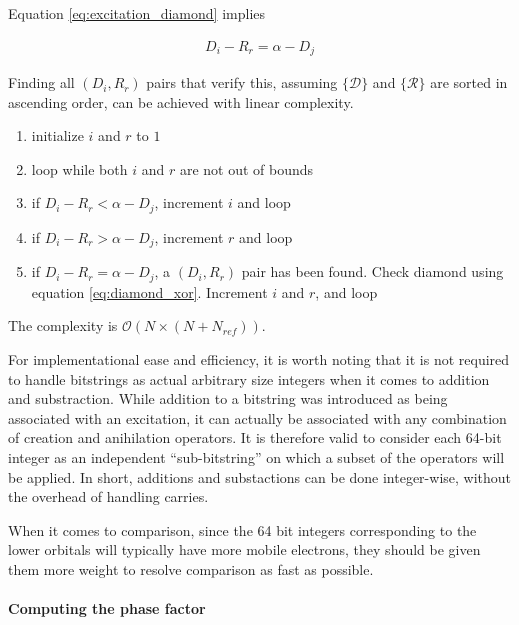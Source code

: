 \documentclass[./thesis.tex]{subfiles}
\begin{document}
Equation \ref{eq:excitation_diamond} implies

\begin{align}
D_i - R_r = \alpha - D_j 
\end{align}

Finding all $(D_i, R_r)$ pairs that verify this, assuming $\{\mathcal{D}\}$ and $\{\mathcal{R}\}$ are sorted in ascending order, can be achieved with linear complexity.


\begin{enumerate}
\item
initialize $i$ and $r$ to $1$
\item
loop while both $i$ and $r$ are not out of bounds
\item
if $D_i - R_r < \alpha - D_j$, increment $i$ and loop
\item
if $D_i - R_r > \alpha - D_j$, increment $r$ and loop
\item
if $D_i - R_r = \alpha - D_j$, a $(D_i, R_r)$ pair has been found. Check diamond using equation \ref{eq:diamond_xor}. Increment $i$ and $r$, and loop
\end{enumerate}

The complexity is $\mathcal{O}(N \times (N+N_{ref}))$.


For implementational ease and efficiency, it is worth noting that it is not required to handle bitstrings as actual arbitrary size integers when it comes to addition and substraction. While addition to a bitstring was introduced as being associated with an excitation, it can actually be associated with any combination of creation and anihilation operators. It is therefore valid to consider each 64-bit integer as an independent ``sub-bitstring'' on which a subset of the operators will be applied. In short, additions and substactions can be done integer-wise, without the overhead of handling carries.

When it comes to comparison, since the 64 bit integers corresponding to the lower orbitals will typically have more mobile electrons, they should be given them more weight to resolve comparison as fast as possible.

\paragraph{Computing the phase factor}
\end{document}
